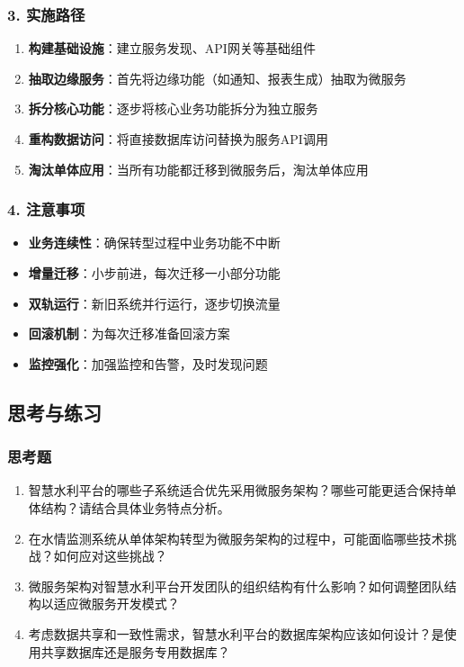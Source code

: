 \subsubsection{3. 实施路径}\label{ux5b9eux65bdux8defux5f84}

\begin{enumerate}
\def\labelenumi{\arabic{enumi}.}
\tightlist
\item
  \textbf{构建基础设施}：建立服务发现、API网关等基础组件
\item
  \textbf{抽取边缘服务}：首先将边缘功能（如通知、报表生成）抽取为微服务
\item
  \textbf{拆分核心功能}：逐步将核心业务功能拆分为独立服务
\item
  \textbf{重构数据访问}：将直接数据库访问替换为服务API调用
\item
  \textbf{淘汰单体应用}：当所有功能都迁移到微服务后，淘汰单体应用
\end{enumerate}

\subsubsection{4. 注意事项}\label{ux6ce8ux610fux4e8bux9879}

\begin{itemize}
\tightlist
\item
  \textbf{业务连续性}：确保转型过程中业务功能不中断
\item
  \textbf{增量迁移}：小步前进，每次迁移一小部分功能
\item
  \textbf{双轨运行}：新旧系统并行运行，逐步切换流量
\item
  \textbf{回滚机制}：为每次迁移准备回滚方案
\item
  \textbf{监控强化}：加强监控和告警，及时发现问题
\end{itemize}

\subsection{思考与练习}\label{ux601dux8003ux4e0eux7ec3ux4e60}

\subsubsection{思考题}\label{ux601dux8003ux9898}

\begin{enumerate}
\def\labelenumi{\arabic{enumi}.}
\item
  智慧水利平台的哪些子系统适合优先采用微服务架构？哪些可能更适合保持单体结构？请结合具体业务特点分析。
\item
  在水情监测系统从单体架构转型为微服务架构的过程中，可能面临哪些技术挑战？如何应对这些挑战？
\item
  微服务架构对智慧水利平台开发团队的组织结构有什么影响？如何调整团队结构以适应微服务开发模式？
\item
  考虑数据共享和一致性需求，智慧水利平台的数据库架构应该如何设计？是使用共享数据库还是服务专用数据库？
\end{enumerate}

